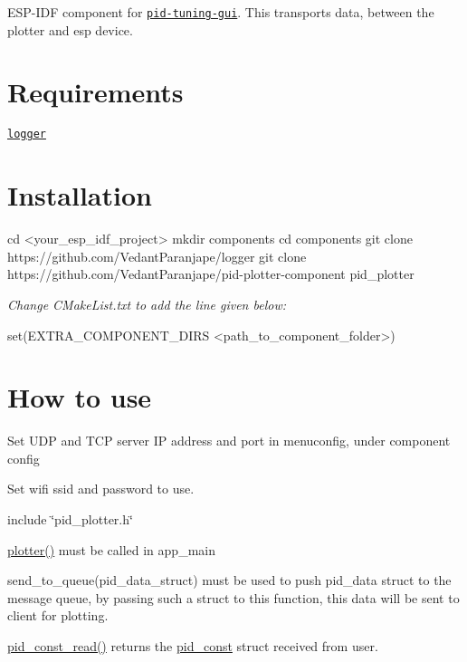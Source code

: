 
\begin{DoxyItemize}
\item E\+S\+P-\/\+I\+DF component for \href{https://github.com/VedantParanjape/pid-tuning-gui}{\tt pid-\/tuning-\/gui}. This transports data, between the plotter and esp device.
\end{DoxyItemize}

\section*{Requirements}


\begin{DoxyItemize}
\item \href{https://github.com/VedantParanjape/logger}{\tt logger}
\end{DoxyItemize}

\section*{Installation}

\begin{DoxyVerb}cd <your_esp_idf_project>
mkdir components
cd components
git clone https://github.com/VedantParanjape/logger   
git clone https://github.com/VedantParanjape/pid-plotter-component pid_plotter
\end{DoxyVerb}


{\itshape Change C\+Make\+List.\+txt to add the line given below\+:} \begin{DoxyVerb}set(EXTRA_COMPONENT_DIRS <path_to_component_folder>)
\end{DoxyVerb}


\section*{How to use}


\begin{DoxyItemize}
\item Set U\+DP and T\+CP server IP address and port in menuconfig, under component config
\item Set wifi ssid and password to use.
\item include \char`\"{}pid\+\_\+plotter.\+h\char`\"{}
\item {\ttfamily \hyperlink{plotter_8h_acc8c0bc33035955e5c765b474fb33ef1}{plotter()}} must be called in app\+\_\+main
\item {\ttfamily send\+\_\+to\+\_\+queue(pid\+\_\+data\+\_\+struct)} must be used to push pid\+\_\+data struct to the message queue, by passing such a struct to this function, this data will be sent to client for plotting.
\item {\ttfamily \hyperlink{transport_8h_aa37b5765ca807a54890c516c916e7e9b}{pid\+\_\+const\+\_\+read()}} returns the \hyperlink{structpid__const}{pid\+\_\+const} struct received from user.
\end{DoxyItemize}

